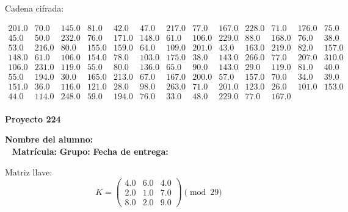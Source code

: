 \documentclass[12pt]{article}
\begin{document}
Cadena cifrada:
\begin{center}
$\begin{array}{lllllllllllll}
201.0 & 70.0 & 145.0 & 81.0 & 42.0 & 47.0 & 217.0 & 77.0 & 167.0 & 228.0 & 71.0 & 176.0 & 75.0\\
45.0 & 50.0 & 232.0 & 76.0 & 171.0 & 148.0 & 61.0 & 106.0 & 229.0 & 88.0 & 168.0 & 76.0 & 38.0\\
53.0 & 216.0 & 80.0 & 155.0 & 159.0 & 64.0 & 109.0 & 201.0 & 43.0 & 163.0 & 219.0 & 82.0 & 157.0\\
148.0 & 61.0 & 106.0 & 154.0 & 78.0 & 103.0 & 175.0 & 38.0 & 143.0 & 266.0 & 77.0 & 207.0 & 310.0\\
106.0 & 231.0 & 119.0 & 55.0 & 80.0 & 136.0 & 65.0 & 90.0 & 143.0 & 29.0 & 119.0 & 81.0 & 40.0\\
55.0 & 194.0 & 30.0 & 165.0 & 213.0 & 67.0 & 167.0 & 200.0 & 57.0 & 157.0 & 70.0 & 34.0 & 39.0\\
151.0 & 36.0 & 116.0 & 121.0 & 28.0 & 98.0 & 263.0 & 71.0 & 201.0 & 123.0 & 26.0 & 101.0 & 153.0\\
44.0 & 114.0 & 248.0 & 59.0 & 194.0 & 76.0 & 33.0 & 48.0 & 229.0 & 77.0 & 167.0\\
\end{array}$
\end{center}

\newpage


\textbf{Proyecto 224}

\textbf{Nombre del alumno:} \underline{\hspace{13cm}}\\\
\vspace{1cm}
\textbf{Matrícula:} \underline{\hspace{4cm}} \hspace{1cm}
\textbf{Grupo:} \underline{\hspace{2cm}}
\textbf{Fecha de entrega:} \underline{\hspace{2cm}}

\medskip

Matriz llave:
\[
K = \begin{pmatrix}
4.0 & 6.0 & 4.0\\
2.0 & 1.0 & 7.0\\
8.0 & 2.0 & 9.0
\end{pmatrix} \pmod{29}
\]
\end{document}
